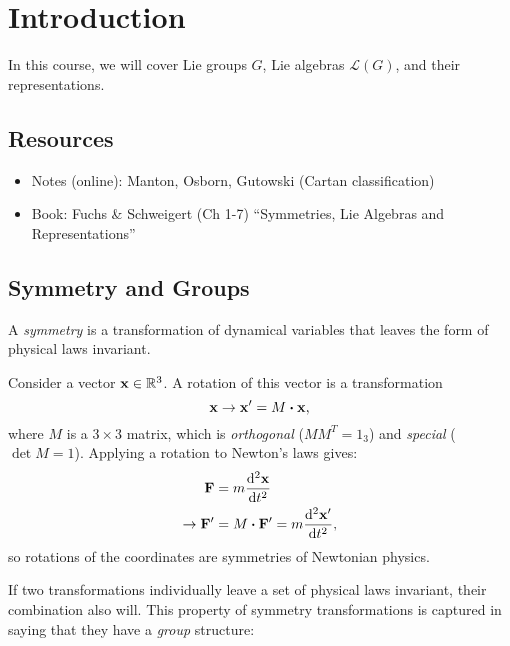 \chapter{Introduction}%
\label{cha:introduction}

In this course, we will cover Lie groups $G$, Lie algebras $\mathscr{L}(G)$, and their representations.

\section*{Resources}%
\label{sec:resources}

\begin{itemize}
  \item Notes (online): Manton, Osborn, Gutowski (Cartan classification)
  \item Book: Fuchs \& Schweigert (Ch 1-7) ``Symmetries, Lie Algebras and Representations''
\end{itemize}

\section{Symmetry and Groups}%
\label{sec:groups_and_lie_groups}

\begin{definition}
A \emph{symmetry} is a transformation of dynamical variables that leaves the form of physical laws invariant.
\end{definition}

\begin{example}[Rotation]
  Consider a vector $\vb{x} \in \mathbb{R}^3$. A rotation of this vector is a transformation
  \begin{equation}
    \vb{x} \to \vb x' = M \vdot \vb x,
  \end{equation}
  where $M$ is a $3\times 3$ matrix, which is \emph{orthogonal} ($M M^T = 1_{3}$) and \emph{special} ($\det M = 1$).  Applying a rotation to Newton's laws gives:
  \begin{align}
    \vb F &= m \dv[2]{\vb x}{t} \\
    \rightarrow \vb F' &= M \vdot \vb F' = m \dv[2]{\vb x'}{t},
  \end{align}
  so rotations of the coordinates are symmetries of Newtonian physics.
\end{example}

If two transformations individually leave a set of physical laws invariant, their combination also will. This property of symmetry transformations is captured in saying that they have a \emph{group} structure:

